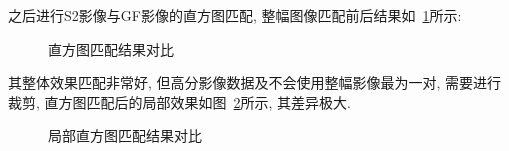 之后进行S2影像与GF影像的直方图匹配, 整幅图像匹配前后结果如~\ref{fig:0207}所示:

\begin{figure}[!htbp]
    \centering
    \qquad
    \caption{直方图匹配结果对比}
    \label{fig:0207}
\end{figure}

其整体效果匹配非常好, 但高分影像数据及不会使用整幅影像最为一对, 需要进行裁剪, 直方图匹配后的局部效果如图~\ref{fig:0208}所示, 其差异极大. 

\begin{figure}[!htbp]
    \centering
    \qquad
    \caption{局部直方图匹配结果对比}
    \label{fig:0208}
\end{figure}

